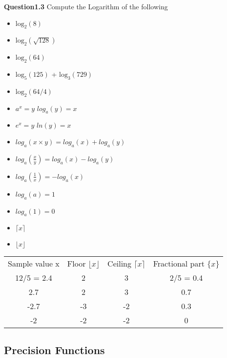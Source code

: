 \documentclass[]{report}
\begin{document}
\noindent \textbf{Question1.3} Compute the Logarithm of the following
\begin{itemize}
\item $\mbox{log}_2(8)$
\item $\mbox{log}_2(\sqrt{128})$
\item $\mbox{log}_2(64)$
\item $\mbox{log}_5(125)$ +   $\mbox{log}_3(729)$
\item $\mbox{log}_2(64/4)$
\end{itemize}


\begin{itemize}
\item $a^x = y$  $log_a(y) = x$

\item $e^x = y$  $ln(y)=x$

\item $log_a(x\times y) = log_a(x) + log_a(y)$

\item $log_a(\frac{x}{y}) = log_a(x) - log_a(y)$

\item $log_a(\frac{1}{x}) = - log_a(x)$

\item $log_a(a) = 1$

\item $log_a(1) = 0$
\end{itemize}


\begin{itemize}
\item $\lceil x\rceil$

\item $\lfloor x\rfloor$
\end{itemize}

\begin{tabular}{|c|c|c|c|}
\hline Sample value x & Floor $\lfloor x\rfloor$ & Ceiling  $\lceil x\rceil$ & Fractional part $ \{ x \} $\\
12/5 = 2.4 &2&3&2/5 = 0.4\\
2.7&2&3&0.7\\
-2.7&-3&-2&0.3\\
-2&-2&-2&0\\
\hline 
\end{tabular} 

\subsection{Precision Functions}
\end{document}

